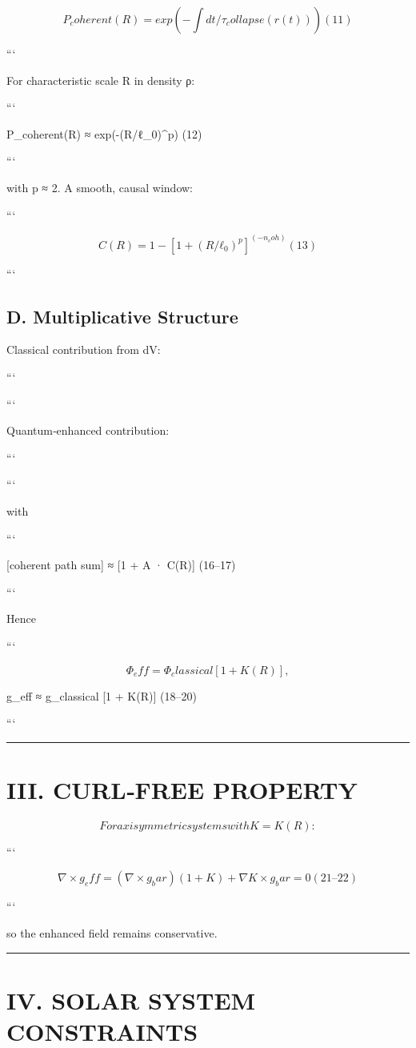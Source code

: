 \documentclass[11pt,a4paper]{article}
\begin{document}
\[
P_coherent(R) = exp(-∫ dt/τ_collapse(r(t)))     (11)
\]

```


For characteristic scale R in density ρ:

```

P\_coherent(R) ≈ exp(-(R/ℓ\_0)^p)     (12)

```


with p ≈ 2. A smooth, causal window:

```

\[
C(R) = 1 - [1 + (R/ℓ_0)^p]^(-n_coh)     (13)
\]

```


\subsection{D. Multiplicative Structure}


Classical contribution from dV:

```

```

Quantum‑enhanced contribution:

```

```

with

```

[coherent path sum] ≈ [1 + A · C(R)]     (16–17)

```

Hence

```

\[
Φ_eff = Φ_classical [1 + K(R)],
\]

 g\_eff ≈ g\_classical [1 + K(R)]     (18–20)

```


\medskip\hrule\medskip


\section{III. CURL‑FREE PROPERTY}


\[
For axisymmetric systems with K=K(R):
\]

```

\[
∇ × g_eff = (∇ × g_bar)(1+K) + ∇K × g_bar = 0     (21–22)
\]

```

so the enhanced field remains conservative.


\medskip\hrule\medskip


\section{IV. SOLAR SYSTEM CONSTRAINTS}
\end{document}
